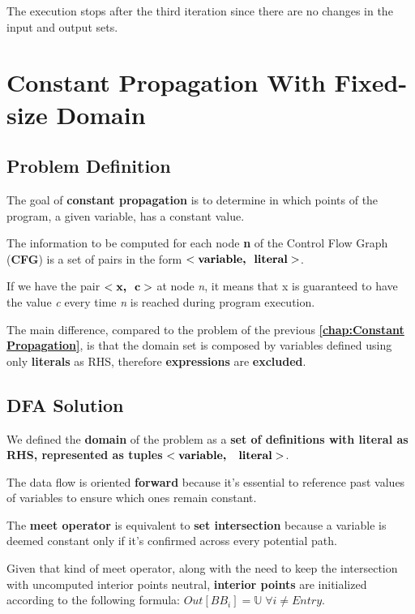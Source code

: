 \documentclass[a4paper,12pt,numbers=noenddot]{scrreprt}
\begin{document}
        The execution stops after the third iteration since there are no changes in the input and output sets.
    
        \newpage
        \chapter*{Constant Propagation With Fixed-size Domain}
        \label{chap:Constant Propagation with Fixed-size Domain}

        \section*{Problem Definition}

        The goal of \textbf{constant propagation} is to determine in which points of the program, a given variable, has a constant value.
        
        The information to be computed for each node \textbf{n} of the Control Flow Graph (\textbf{CFG}) is a set of pairs in the form $<\textbf{variable,\; literal}>$.
        
        If we have the pair $<\textbf{x,\; c}>$ at node \textit{n}, it means that x is guaranteed to have the value \textit{c} every time \textit{n} is reached during program execution.

        The main difference, compared to the problem of the previous \textbf{\autoref{chap:Constant Propagation}}, is that the domain set is composed by variables defined using only \textbf{literals} as RHS, therefore \textbf{expressions} are \textbf{excluded}.
        
        \section*{DFA Solution}
        
        We defined the \textbf{domain} of the problem as a \textbf{set of definitions with literal as RHS, represented as tuples} $<\textbf{variable, \; literal}>$.
        
        The data flow is oriented \textbf{forward} because it's essential to reference past values of variables to ensure which ones remain constant.
        
        The \textbf{meet operator} is equivalent to \textbf{set intersection} because a variable is deemed constant only if it's confirmed across every potential path.
        
        Given that kind of meet operator, along with the need to keep the intersection with uncomputed interior points neutral, \textbf{interior points} are initialized according to the following formula: $Out[BB_i] = \mathbb{U} \; \forall i \neq Entry$.
        
\end{document}
